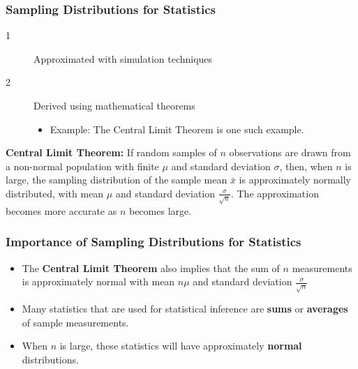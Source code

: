 \documentclass[12pt, letterpaper]{article}
\begin{document}
            \subsubsection{Sampling Distributions for Statistics} 
                \begin{description}
                    \item[1] Approximated with simulation techniques
                    \item[2] Derived using mathematical theorems
                    \begin{itemize}
                        \item Example: The Central Limit Theorem is one such example.
                    \end{itemize}
                \end{description}
                \begin{mdframed}[leftmargin=10pt, rightmargin=10pt]
                    \textbf{Central Limit Theorem:} If random samples of $n$ observations are drawn from a non-normal population with finite $\mu$ and standard deviation $\sigma$, then, when $n$ is large, the sampling distribution of the sample mean $\bar{x}$ is approximately normally distributed, with mean $\mu$ and standard deviation $\frac{\sigma}{\sqrt{n}}$. The approximation becomes more accurate as $n$ becomes large.
                \end{mdframed}
            \subsubsection{Importance of Sampling Distributions for Statistics}
                \begin{itemize}
                    \item The \textbf{Central Limit Theorem} also implies that the sum of $n$ measurements is approximately normal with mean $n\mu$ and standard deviation $\frac{\sigma}{\sqrt{n}}$
                    \item Many statistics that are used for statistical inference are \textbf{sums} or \textbf{averages} of sample measurements.
                    \item When $n$ is large, these statistics will have approximately \textbf{normal} distributions.
                \end{itemize}
\end{document}
